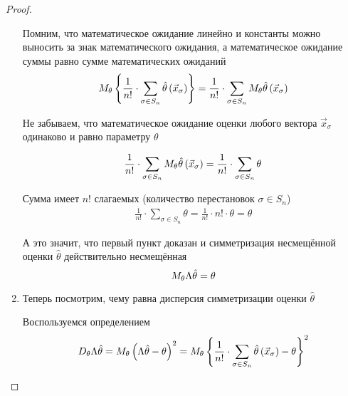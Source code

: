 \begin{proof}
\begin{enumerate}
            Помним, что математическое ожидание линейно и
            константы можно выносить за знак математического ожидания,
            а математическое ожидание суммы равно сумме математических ожиданий
            \begin{align*}
                M_{\theta} \left\{\frac{1}{n!}\cdot\sum_{\sigma\in S_n}
                    \hat{\theta}\left(\vec{x}_\sigma\right)\right\}
                    =\frac{1}{n!}\cdot\sum_{\sigma\in S_n}
                        M_{\theta} \hat{\theta}\left(\vec{x}_\sigma\right)
            \end{align*}

            Не забываем, что математическое ожидание оценки
            любого вектора $\vec{x}_\sigma$ одинаково и равно параметру $\theta$

            \begin{align*}
                \frac{1}{n!}\cdot\sum_{\sigma\in S_n}
                    M_{\theta} \hat{\theta}\left(\vec{x}_\sigma\right)
                    =\frac{1}{n!}\cdot\sum_{\sigma\in S_n}\theta
            \end{align*}

            Сумма имеет $n!$ слагаемых (количество перестановок $\sigma\in S_n$)
            \begin{align*}
                \frac{1}{n!}\cdot\sum_{\sigma\in S_n}\theta
                    =\frac{1}{n!}\cdot n!\cdot\theta
                    =\theta
            \end{align*}

            А это значит, что первый пункт доказан и симметризация
            несмещённой оценки $\hat{\theta}$ действительно несмещённая
            $$M_{\theta} \Lambda\hat{\theta}=\theta$$
    \item
    Теперь посмотрим, чему равна дисперсия симметризации оценки $\hat{\theta}$

    Воспользуемся определением
    \begin{align*}
        D_{\theta} \Lambda\hat{\theta}
            =M_{\theta} \left(\Lambda\hat{\theta}-\theta\right)^2
            =M_{\theta} \left\{\frac{1}{n!}\cdot\sum_{\sigma\in S_n}
                \hat{\theta}\left(\vec{x}_\sigma\right)-\theta\right\}^2
    \end{align*}


\end{enumerate}
\end{proof}
